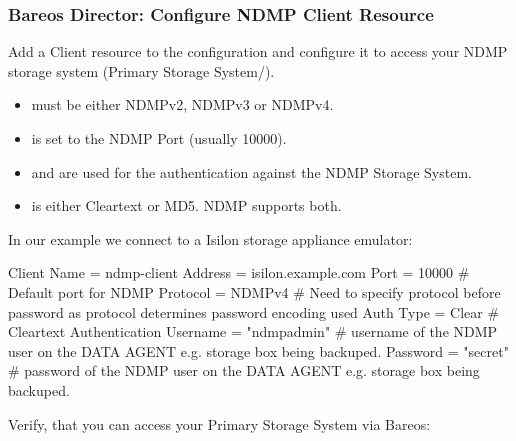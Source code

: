 \subsubsection{Bareos Director: Configure NDMP Client Resource}

Add a Client resource to the \bareosDir configuration
and configure it to access your NDMP storage system (Primary Storage System/\DataAgent).

\begin{itemize}
    \item {} must be either NDMPv2, NDMPv3 or NDMPv4.
    \item {} is set to the NDMP Port (usually 10000).
    \item {} and  are used for the authentication against the NDMP Storage System.
    \item {} is either Cleartext or MD5. NDMP supports both.
\end{itemize}

In our example we connect to a Isilon storage appliance emulator:
\begin{bconfig}{}
Client {
  Name = ndmp-client
  Address = isilon.example.com
  Port = 10000            # Default port for NDMP
  Protocol = NDMPv4       # Need to specify protocol before password as protocol determines password encoding used
  Auth Type = Clear       # Cleartext Authentication
  Username = "ndmpadmin"  # username of the NDMP user on the DATA AGENT e.g. storage box being backuped.
  Password = "secret"     # password of the NDMP user on the DATA AGENT e.g. storage box being backuped.
}
\end{bconfig}

Verify, that you can access your Primary Storage System via Bareos:


